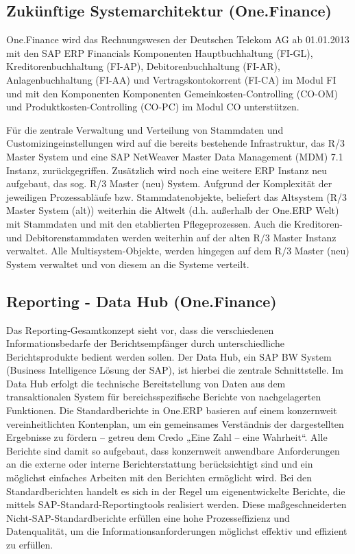 \subsection{Zukünftige Systemarchitektur (One.Finance)}
One.Finance wird das Rechnungswesen der Deutschen Telekom AG ab 01.01.2013 mit den SAP ERP Financials Komponenten Hauptbuchhaltung (FI-GL), Kreditorenbuchhaltung (FI-AP), Debitorenbuchhaltung (FI-AR), Anlagenbuchhaltung (FI-AA) und Vertragskontokorrent (FI-CA) im Modul FI und mit den Komponenten Komponenten  Gemeinkosten-Controlling (CO-OM) und Produktkosten-Controlling (CO-PC) im Modul CO unterstützen.

Für die zentrale Verwaltung und Verteilung von Stammdaten und Customizingeinstellungen wird auf die bereits bestehende Infrastruktur, das R/3 Master System und eine SAP NetWeaver Master Data Management (MDM) 7.1 Instanz, zurückgegriffen. Zusätzlich wird noch eine weitere ERP Instanz neu aufgebaut, das sog. R/3 Master (neu) System. 
Aufgrund der Komplexität der jeweiligen Prozessabläufe bzw. Stammdatenobjekte, beliefert das Altsystem (R/3 Master System (alt)) weiterhin die Altwelt (d.h. außerhalb der One.ERP Welt) mit Stammdaten und mit den etablierten Pflegeprozessen.  Auch die Kreditoren- und Debitorenstammdaten werden weiterhin auf der alten R/3 Master Instanz verwaltet. Alle Multisystem-Objekte, werden hingegen auf dem R/3 Master (neu) System verwaltet und von diesem an die Systeme verteilt. 

\subsection{Reporting - Data Hub (One.Finance)}
Das Reporting-Gesamtkonzept sieht vor, dass die verschiedenen Informationsbedarfe der Berichtsempfänger durch unterschiedliche Berichtsprodukte bedient werden sollen. 
Der Data Hub, ein SAP BW System (Business Intelligence Lösung der SAP), ist hierbei die zentrale Schnittstelle. Im Data Hub erfolgt die technische Bereitstellung von Daten aus dem transaktionalen System für bereichsspezifische Berichte von nachgelagerten Funktionen.
Die Standardberichte in One.ERP basieren auf einem konzernweit vereinheitlichten Kontenplan, um ein gemeinsames Verständnis der dargestellten Ergebnisse zu fördern -- getreu dem Credo „Eine Zahl -- eine Wahrheit“. Alle Berichte sind damit so aufgebaut, dass konzernweit anwendbare Anforderungen an die externe oder interne Berichterstattung berücksichtigt sind und ein möglichst einfaches Arbeiten mit den Berichten ermöglicht wird. 
Bei den Standardberichten handelt es sich in der Regel um eigenentwickelte Berichte, die mittels SAP-Standard-Reportingtools realisiert werden. Diese maßgeschneiderten Nicht-SAP-Standardberichte erfüllen eine hohe Prozesseffizienz und Datenqualität, um die Informationsanforderungen möglichst effektiv und effizient zu erfüllen.
